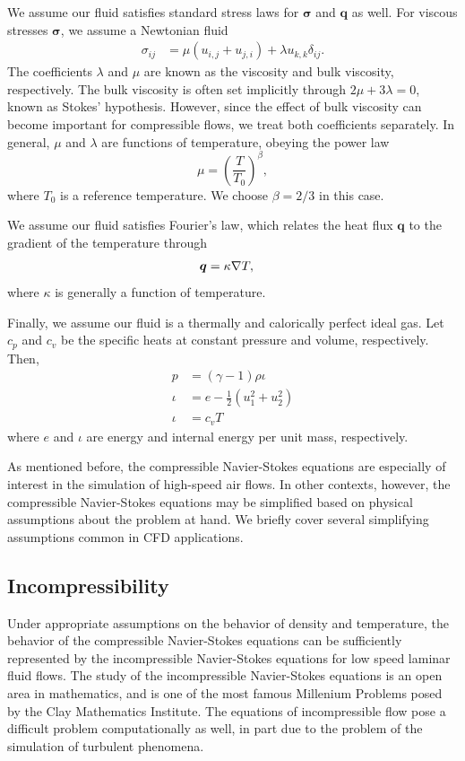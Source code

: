 We assume our fluid satisfies standard stress laws for $\boldsymbol \sigma$ and $\boldsymbol q$ as well. For viscous stresses $\boldsymbol \sigma$, we assume a Newtonian fluid
\begin{align*}
\sigma_{ij} &= \mu(u_{i,j}+u_{j,i}) + \lambda u_{k,k}\delta_{ij}.
\end{align*}
The coefficients $\lambda$ and $\mu$ are known as the viscosity and bulk viscosity, respectively. The bulk viscosity is often set implicitly through $2\mu + 3\lambda = 0$, known as Stokes' hypothesis. However, since the effect of bulk viscosity can become important for compressible flows, we treat both coefficients separately. In general, $\mu$ and $\lambda$ are functions of temperature, obeying the power law
\[
\mu = \left(\frac{T}{T_0}\right)^\beta,
\]
where $T_0$ is a reference temperature. We choose $\beta = 2/3$ in this case. 

We assume our fluid satisfies Fourier's law, which relates the heat flux $\boldsymbol q$ to the gradient of the temperature through
\begin{align*}
{\boldsymbol q} &= \kappa \grad T,
\end{align*}
where $\kappa$ is generally a function of temperature. 

Finally, we assume our fluid is a thermally and calorically perfect ideal gas. Let $c_p$ and $c_v$ be the specific heats at constant pressure and volume, respectively. Then,
\begin{align*}
p &= (\gamma-1)\rho\iota\\
\iota &= e-\frac{1}{2}(u_1^2+u_2^2)\\
\iota &= c_vT
\end{align*}
where $e$ and $\iota$ are energy and internal energy per unit mass, respectively. 

As mentioned before, the compressible Navier-Stokes equations are especially of interest in the simulation of high-speed air flows. In other contexts, however, the compressible Navier-Stokes equations may be simplified based on physical assumptions about the problem at hand. We briefly cover several simplifying assumptions common in CFD applications. 

\subsection{Incompressibility}

Under appropriate assumptions on the behavior of density and temperature, the behavior of the compressible Navier-Stokes equations can be sufficiently represented by the incompressible Navier-Stokes equations for low speed laminar fluid flows. The study of the incompressible Navier-Stokes equations is an open area in mathematics, and is one of the most famous Millenium Problems posed by the Clay Mathematics Institute. The equations of incompressible flow pose a difficult problem computationally as well, in part due to the problem of the simulation of turbulent phenomena. 

